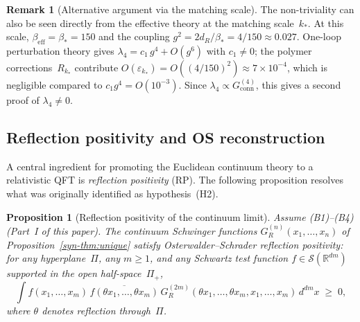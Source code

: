 \documentclass[11pt]{article}
\newtheorem{proposition}[theorem]{Proposition}
\theoremstyle{definition}
\newtheorem{remark}[theorem]{Remark}
\newcommand{\R}{\mathbb{R}}
\begin{document}
\begin{remark}[Alternative argument via the matching scale]
\label{syn-rem:dobrushin_nontrivial}
The non-triviality can also be seen directly from the
effective theory at the matching scale~$k_*$.  At this
scale, $\beta_{\mathrm{eff}} = \beta_* = 150$ and the
coupling $g^2 = 2d_R/\beta_* = 4/150 \approx 0.027$.
One-loop perturbation theory gives
$\lambda_4 = c_1\,g^4 + O(g^6)$ with $c_1 \neq 0$;
the polymer corrections~$R_{k_*}$ contribute
$O(\varepsilon_{k_*}) = O((4/150)^2) \approx 7\times 10^{-4}$,
which is negligible compared to $c_1 g^4 = O(10^{-3})$.
Since $\lambda_4 \propto G_{\mathrm{conn}}^{(4)}$,
this gives a second proof of $\lambda_4 \neq 0$.
\end{remark}

\subsection{Reflection positivity and OS reconstruction}

A central ingredient for promoting the Euclidean continuum
theory to a relativistic QFT is \emph{reflection positivity}
(RP).  The following proposition resolves what was originally
identified as hypothesis~(H2).

\begin{proposition}[Reflection positivity of the continuum
limit]\label{syn-prop:rp}
Assume (B1)--(B4) (Part~I of this paper).
The continuum Schwinger functions
$G_R^{(n)}(x_1, \ldots, x_n)$ of
Proposition~\ref{syn-thm:unique} satisfy
Osterwalder--Schrader reflection positivity:
for any hyperplane~$\Pi$, any $m \geq 1$, and any
Schwartz test function $f \in \mathcal{S}(\R^{dm})$
supported in the open half-space~$\Pi_+$,
\begin{equation}\label{syn-eq:rp}
  \int f(x_1,\ldots,x_m)\,\overline{f(\theta x_1,
  \ldots,\theta x_m)}\,
  G_R^{(2m)}(\theta x_1, \ldots, \theta x_m,
  x_1, \ldots, x_m)\,
  d^{dm}x \;\geq\; 0,
\end{equation}
where $\theta$ denotes reflection through~$\Pi$.
\end{proposition}
\end{document}
